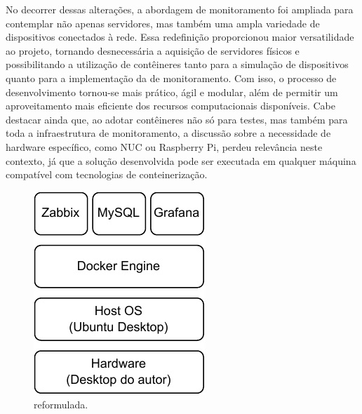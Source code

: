 No decorrer dessas alterações, a abordagem de monitoramento foi ampliada para contemplar não apenas servidores, mas também uma ampla variedade de dispositivos conectados à rede. Essa redefinição proporcionou maior versatilidade ao projeto, tornando desnecessária a aquisição de servidores físicos e possibilitando a utilização de contêineres tanto para a simulação de dispositivos quanto para a implementação da  de monitoramento. Com isso, o processo de desenvolvimento tornou-se mais prático, ágil e modular, além de permitir um aproveitamento mais eficiente dos recursos computacionais disponíveis. Cabe destacar ainda que, ao adotar contêineres não só para testes, mas também para toda a infraestrutura de monitoramento, a discussão sobre a necessidade de hardware específico, como NUC ou Raspberry Pi, perdeu relevância neste contexto, já que a solução desenvolvida pode ser executada em qualquer máquina compatível com tecnologias de conteinerização.

\begin{figure}[H]
\centering
\includegraphics[scale=0.97]{Imagens/chap03/v2_stack.pdf}
\caption{ reformulada.}
\label{fig:StackReformulada}
\end{figure}

